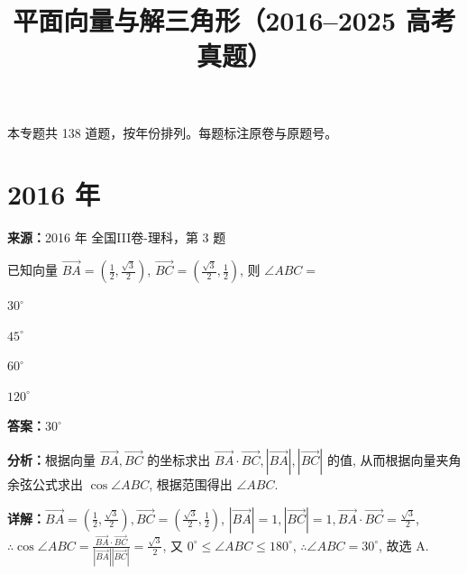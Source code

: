 ﻿\title{平面向量与解三角形（2016--2025 高考真题）}
\author{}
\date{}
\maketitle
\noindent 本专题共 138 道题，按年份排列。每题标注原卷与原题号。

\section*{2016 年}

\begin{question}[points=5]
\textbf{来源：}2016 年 全国III卷-理科，第 3 题\par
已知向量 $\overrightarrow{BA}=(\frac{1}{2},\frac{\sqrt{3}}{2})$, $\overrightarrow{BC}=(\frac{\sqrt{3}}{2},\frac{1}{2})$, 则 $\angle ABC=$
\begin{choices}
  \item $30^\circ$
  \item $45^\circ$
  \item $60^\circ$
  \item $120^\circ$
\end{choices}
\begin{solution}
\textbf{答案：}$30^\circ$

\textbf{分析：}根据向量 $\overrightarrow{BA},\overrightarrow{BC}$ 的坐标求出 $\overrightarrow{BA}\cdot\overrightarrow{BC},|\overrightarrow{BA}|,|\overrightarrow{BC}|$ 的值, 从而根据向量夹角余弦公式求出 $\cos\angle ABC$, 根据范围得出 $\angle ABC$.

\textbf{详解：}$\overrightarrow{BA}=(\frac{1}{2},\frac{\sqrt{3}}{2}),\overrightarrow{BC}=(\frac{\sqrt{3}}{2},\frac{1}{2})$, $|\overrightarrow{BA}|=1,|\overrightarrow{BC}|=1,\overrightarrow{BA}\cdot\overrightarrow{BC}=\frac{\sqrt{3}}{2}$, $\therefore \cos\angle ABC=\frac{\overrightarrow{BA}\cdot\overrightarrow{BC}}{|\overrightarrow{BA}||\overrightarrow{BC}|}=\frac{\sqrt{3}}{2}$, 又 $0^\circ\le\angle ABC\le180^\circ$, $\therefore\angle ABC=30^\circ$, 故选 A.
\end{solution}
\end{question}

